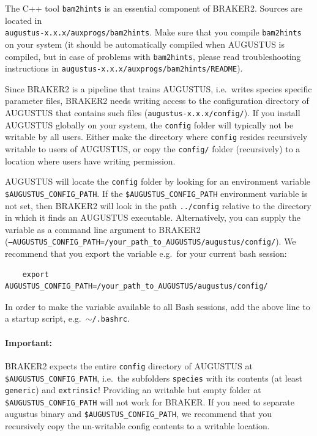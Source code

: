 \documentclass[a4paper,10pt]{report}
\begin{document}
   The C++ tool \texttt{bam2hints} is an essential component of BRAKER2. Sources are located in \\\texttt{augustus-x.x.x/auxprogs/bam2hints}. Make sure that you compile \texttt{bam2hints} on your system (it should be automatically compiled when AUGUSTUS is compiled, but in case of problems with \texttt{bam2hints}, please read troubleshooting instructions in 
   \texttt{augustus-x.x.x/auxprogs/bam2hints/README}).
   
   Since BRAKER2 is a pipeline that trains AUGUSTUS, i.e.~writes species specific parameter files, BRAKER2 needs writing access to the configuration directory of AUGUSTUS that contains such files  (\texttt{augustus-x.x.x/config/}). If you install AUGUSTUS
   globally on your system, the \texttt{config} folder will typically not be writable by all users. Either make the directory where \texttt{config} resides recursively writable to users of AUGUSTUS, or copy the \texttt{config/} folder (recursively) to a location where users have writing permission. 
   
   AUGUSTUS will locate the \texttt{config} folder by looking for an environment variable \texttt{\$AUGUSTUS\_CONFIG\_PATH}. If the \texttt{\$AUGUSTUS\_CONFIG\_PATH} environment variable is not set, then BRAKER2 will look in 
    the path \texttt{../config} relative to the directory in which it finds an AUGUSTUS executable. Alternatively, you can supply the variable as a command line argument to BRAKER2\\ (\texttt{--AUGUSTUS\_CONFIG\_PATH=/your\_path\_to\_AUGUSTUS/augustus/config/}). We recommend that you export the variable e.g.~for your current bash session:

    \begin{verbatim}
    export AUGUSTUS_CONFIG_PATH=/your_path_to_AUGUSTUS/augustus/config/
    \end{verbatim}

In order to make the variable available to all Bash sessions, add the above line to a startup script, e.g.~\texttt{$\sim$/.bashrc}.

\paragraph{Important: } BRAKER2 expects the entire \texttt{config} directory of AUGUSTUS at \texttt{\$AUGUSTUS\_CONFIG\_PATH}, i.e.~the subfolders \texttt{species} with its contents (at least \texttt{generic}) and \texttt{extrinsic}! Providing an writable but empty folder at \texttt{\$AUGUSTUS\_CONFIG\_PATH} will not work for BRAKER. If you need to separate augustus binary and \texttt{\$AUGUSTUS\_CONFIG\_PATH}, we recommend that you recursively copy the un-writable config contents to a writable location.
\end{document}
